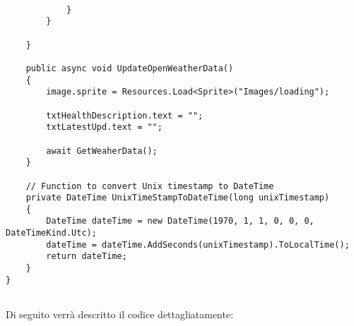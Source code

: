 \begin{lstlisting}[caption=Codice sorgente dello script \textit{OpenWeatherAPICaller}, label=lst:OpenWeatherAPICallerScript, captionpos=b, basicstyle=\scriptsize]
                
            }
        }
        
    }
    
    public async void UpdateOpenWeatherData()
    {
        image.sprite = Resources.Load<Sprite>("Images/loading");
        
        txtHealthDescription.text = "";
        txtLatestUpd.text = "";
        
        await GetWeaherData();
    }
    
    // Function to convert Unix timestamp to DateTime
    private DateTime UnixTimeStampToDateTime(long unixTimestamp)
    {
        DateTime dateTime = new DateTime(1970, 1, 1, 0, 0, 0, DateTimeKind.Utc);
        dateTime = dateTime.AddSeconds(unixTimestamp).ToLocalTime();
        return dateTime;
    }
}


\end{lstlisting}

Di seguito verrà descritto il codice dettagliatamente:

